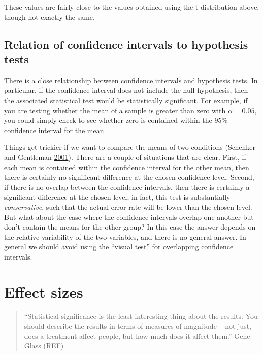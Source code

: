 \documentclass[12pt,]{book}
\begin{document}
These values are fairly close to the values obtained using the t distribution above, though not exactly the same.

\hypertarget{relation-of-confidence-intervals-to-hypothesis-tests}{%
\subsection{Relation of confidence intervals to hypothesis tests}\label{relation-of-confidence-intervals-to-hypothesis-tests}}

There is a close relationship between confidence intervals and hypothesis tests. In particular, if the confidence interval does not include the null hypothesis, then the associated statistical test would be statistically significant. For example, if you are testing whether the mean of a sample is greater than zero with \(\alpha = 0.05\), you could simply check to see whether zero is contained within the 95\% confidence interval for the mean.

Things get trickier if we want to compare the means of two conditions (Schenker and Gentleman \protect\hyperlink{ref-sche:gent:2001}{2001}). There are a couple of situations that are clear. First, if each mean is contained within the confidence interval for the other mean, then there is certainly no significant difference at the chosen confidence level. Second, if there is no overlap between the confidence intervals, then there is certainly a significant difference at the chosen level; in fact, this test is substantially \emph{conservative}, such that the actual error rate will be lower than the chosen level. But what about the case where the confidence intervals overlap one another but don't contain the means for the other group? In this case the answer depends on the relative variability of the two variables, and there is no general answer. In general we should avoid using the ``visual test'' for overlapping confidence intervals.

\hypertarget{effect-sizes}{%
\section{Effect sizes}\label{effect-sizes}}

\begin{quote}
``Statistical significance is the least interesting thing about the results. You should describe the results in terms of measures of magnitude -- not just, does a treatment affect people, but how much does it affect them.'' Gene Glass (REF)
\end{quote}
\end{document}
